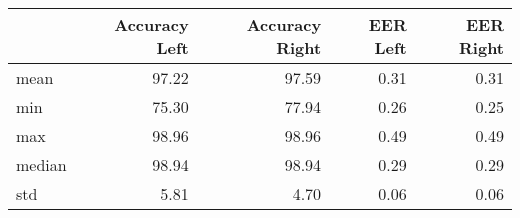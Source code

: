 \begin{tabular}{lrrrr}
\toprule
{} &  Accuracy Left &  Accuracy Right &  EER Left &  EER Right \\
\midrule
mean   &          97.22 &           97.59 &      0.31 &       0.31 \\
min    &          75.30 &           77.94 &      0.26 &       0.25 \\
max    &          98.96 &           98.96 &      0.49 &       0.49 \\
median &          98.94 &           98.94 &      0.29 &       0.29 \\
std    &           5.81 &            4.70 &      0.06 &       0.06 \\
\bottomrule
\end{tabular}
